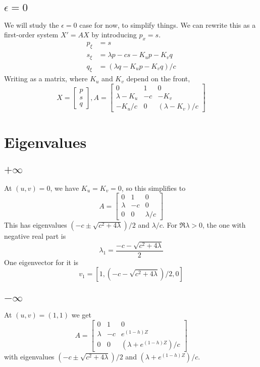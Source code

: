 \documentclass[10pt]{article}
\begin{document}
\subsection{$\epsilon = 0$}
We will study the $\epsilon=0$ case for now, to simplify things.
We can rewrite this as a first-order system $X' = AX$ by introducing $p_x = s$.
\begin{align}
p_\xi &= s \\
s_\xi &= \lambda p - c s - K_u p - K_v q \\
q_\xi &= (\lambda q - K_u p - K_v q)/c
\end{align}
Writing as a matrix, where $K_u$ and $K_v$ depend on the front,
\[
X = \begin{bmatrix}p\\s\\q\end{bmatrix},
A = \begin{bmatrix}
0 & 1 & 0 \\
\lambda - K_u  &  -c  &  -K_v \\
- K_u/c  &  0  &  (\lambda - K_v)/c
\end{bmatrix}
\]

\section{Eigenvalues}
\subsection{$+\infty$}
At $(u,v) = 0$, we have $K_u = K_v = 0$, so this simplifies to
\[
A = \begin{bmatrix}
0 & 1 & 0 \\
\lambda &  -c  &  0 \\
0 &  0  &  \lambda/c
\end{bmatrix}
\]
This has eigenvalues $(-c \pm \sqrt{c^2 + 4 \lambda})/2$ and $\lambda/c$.  For $\Re \lambda > 0$, the one with negative real part is
\[\lambda_1 = \frac{-c - \sqrt{c^2 + 4 \lambda}}{2}\]
One eigenvector for it is
\[v_1 = [1,(-c - \sqrt{c^2 + 4 \lambda})/2,0] \]

\subsection{$-\infty$}
At $(u,v) = (1,1)$ we get
\[
A = \begin{bmatrix}
0 & 1 & 0 \\
\lambda &  -c  &  e^{(1-h)Z} \\
0 &  0  &  (\lambda + e^{(1-h)Z})/c
\end{bmatrix}
\]
with eigenvalues $(-c \pm \sqrt{c^2 + 4 \lambda})/2$ and $(\lambda + e^{(1-h)Z})/c$.
\end{document}
